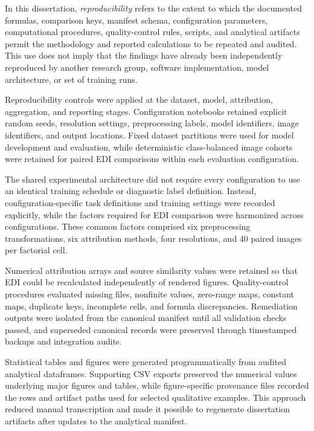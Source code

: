 In this dissertation, \emph{reproducibility} refers to the extent to which the documented formulas, comparison keys, manifest schema, configuration parameters, computational procedures, quality-control rules, scripts, and analytical artifacts permit the methodology and reported calculations to be repeated and audited. This use does not imply that the findings have already been independently reproduced by another research group, software implementation, model architecture, or set of training runs.

Reproducibility controls were applied at the dataset, model, attribution, aggregation, and reporting stages. Configuration notebooks retained explicit random seeds, resolution settings, preprocessing labels, model identifiers, image identifiers, and output locations. Fixed dataset partitions were used for model development and evaluation, while deterministic class-balanced image cohorts were retained for paired EDI comparisons within each evaluation configuration.

The shared experimental architecture did not require every configuration to use an identical training schedule or diagnostic label definition. Instead, configuration-specific task definitions and training settings were recorded explicitly, while the factors required for EDI comparison were harmonized across configurations. These common factors comprised six preprocessing transformations, six attribution methods, four resolutions, and 40 paired images per factorial cell.

Numerical attribution arrays and source similarity values were retained so that EDI could be recalculated independently of rendered figures. Quality-control procedures evaluated missing files, nonfinite values, zero-range maps, constant maps, duplicate keys, incomplete cells, and formula discrepancies. Remediation outputs were isolated from the canonical manifest until all validation checks passed, and superseded canonical records were preserved through timestamped backups and integration audits.

Statistical tables and figures were generated programmatically from audited analytical dataframes. Supporting CSV exports preserved the numerical values underlying major figures and tables, while figure-specific provenance files recorded the rows and artifact paths used for selected qualitative examples. This approach reduced manual transcription and made it possible to regenerate dissertation artifacts after updates to the analytical manifest.


